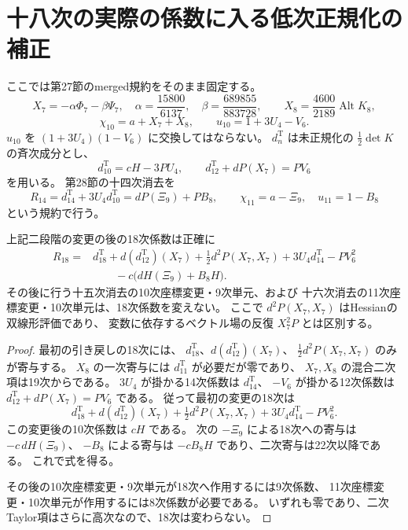 \section{十八次の実際の係数に入る低次正規化の補正}
\label{sec:v14-eighteenth-corrections}

ここでは第27節のmerged規約をそのまま固定する。
\[
 X_7=-\alpha\Phi_7-\beta\Psi_7,
 \quad\alpha=\frac{15800}{6137},\quad
 \beta=\frac{689855}{883728},\qquad
 X_8=\frac{4600}{2189}\operatorname{Alt}K_8,
\]
\[
 \chi_{10}=a+X_7+X_8,\qquad u_{10}=1+3U_4-V_6.
\]
$u_{10}$ を $(1+3U_4)(1-V_6)$ に交換してはならない。
$d^{\mathrm T}_n$ は未正規化の $\tfrac12\det K$ の斉次成分とし、
\[
 d^{\mathrm T}_{10}=cH-3PU_4,
 \qquad d^{\mathrm T}_{12}+dP(X_7)=PV_6
\]
を用いる。
第28節の十四次消去を
\[
 R_{14}=d^{\mathrm T}_{14}+3U_4d^{\mathrm T}_{10}
       =dP(\Xi_9)+PB_8,
 \qquad\chi_{11}=a-\Xi_9,\quad u_{11}=1-B_8
\]
という規約で行う。

\begin{proposition}[十八次の正確な補正式]
\label{prop:v14-raw-eighteen-correction}
上記二段階の変更の後の18次係数は正確に
\begin{equation}\label{eq:v14-raw-eighteen-correction}
 \begin{split}
 R_{18}={}&d^{\mathrm T}_{18}
   +d(d^{\mathrm T}_{12})(X_7)
   +\frac12d^2P(X_7,X_7)
   +3U_4d^{\mathrm T}_{14}-PV_6^2\\
   &\hspace{2em}-c\bigl(dH(\Xi_9)+B_8H\bigr).
 \end{split}
\end{equation}
その後に行う十五次消去の10次座標変更・9次単元、および
十六次消去の11次座標変更・10次単元は、18次係数を変えない。
ここで $d^2P(X_7,X_7)$ はHessianの双線形評価であり、
変数に依存するベクトル場の反復 $X_7^2P$ とは区別する。
\end{proposition}

\begin{proof}
最初の引き戻しの18次には、
$d^{\mathrm T}_{18}$、$d(d^{\mathrm T}_{12})(X_7)$、
$\tfrac12d^2P(X_7,X_7)$ のみが寄与する。
$X_8$ の一次寄与には $d^{\mathrm T}_{11}$ が必要だが零であり、
$X_7,X_8$ の混合二次項は19次からである。
$3U_4$ が掛かる14次係数は $d^{\mathrm T}_{14}$、
$-V_6$ が掛かる12次係数は
$d^{\mathrm T}_{12}+dP(X_7)=PV_6$ である。
従って最初の変更の18次は
\[
 d^{\mathrm T}_{18}+d(d^{\mathrm T}_{12})(X_7)
 +\tfrac12d^2P(X_7,X_7)+3U_4d^{\mathrm T}_{14}-PV_6^2.
\]
この変更後の10次係数は $cH$ である。
次の $-\Xi_9$ による18次への寄与は $-c\,dH(\Xi_9)$、
$-B_8$ による寄与は $-cB_8H$ であり、二次寄与は22次以降である。
これで式を得る。

その後の10次座標変更・9次単元が18次へ作用するには9次係数、
11次座標変更・10次単元が作用するには8次係数が必要である。
いずれも零であり、二次Taylor項はさらに高次なので、18次は変わらない。
\end{proof}

